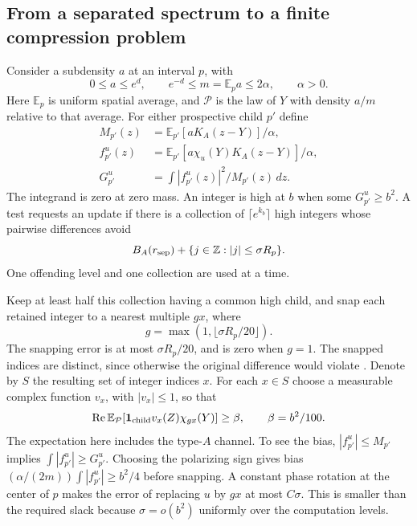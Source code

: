 \subsection{From a separated spectrum to a finite compression problem}

Consider a subdensity $a$ at an interval $p$, with
\[
 0\le a\le e^d,\qquad e^{-d}\le m=\mathbb E_pa\le2\alpha,
 \qquad \alpha>0.
\]
Here $\mathbb E_p$ is uniform spatial average, and $\mathcal P$ is the
law of $Y$ with density $a/m$ relative to that average.  For either
prospective child $p'$ define
\begin{equation}\label{eq:thermal-child-moments}
 \begin{split}
 M_{p'}(z)&=\mathbb E_{p'}[aK_A(z-Y)]/\alpha,\\
 f_{p'}^u(z)&=\mathbb E_{p'}[a\chi_u(Y)K_A(z-Y)]/\alpha,\\
 G_{p'}^u&=\int |f_{p'}^u(z)|^2/M_{p'}(z)\,dz.
 \end{split}
\end{equation}
The integrand is zero at zero mass.  An integer is high at $b$ when
some $G_{p'}^u\ge b^2$.  A test requests an update if there is a
collection of $\lceil e^{k_b}\rceil$ high integers whose pairwise
differences avoid
\begin{equation}\label{eq:thermal-separation}
 B_A(r_{\rm sep})+\{j\in\mathbb Z:|j|\le\sigma R_p\}.
\end{equation}
One offending level and one collection are used at a time.

Keep at least half this collection having a common high child, and snap
each retained integer to a nearest multiple $gx$, where
\[
 g=\max(1,\lfloor\sigma R_p/20\rfloor).
\]
The snapping error is at most $\sigma R_p/20$, and is zero when $g=1$.
The snapped indices are distinct, since otherwise the original
difference would violate .  Denote by $S$ the resulting set of integer indices $x$.  For each $x\in S$ choose a measurable complex function
$v_x$, with $|v_x|\le1$, so that
\begin{equation}\label{eq:source-8}
 \operatorname{Re}\mathbb E_{\mathcal P}
  [\mathbf1_{\rm child}v_x(Z)\chi_{gx}(Y)]\ge\beta,
 \qquad \beta=b^2/100.
\end{equation}
The expectation here includes the type-$A$ channel.  To see the bias,
$|f_{p'}^u|\le M_{p'}$ implies $\int|f_{p'}^u|\ge G_{p'}^u$.
Choosing the polarizing sign gives bias
$(\alpha/(2m))\int|f_{p'}^u|\ge b^2/4$ before snapping.  A constant
phase rotation at the center of $p$ makes the error of replacing $u$
by $gx$ at most $C\sigma$.  This is smaller than the required slack
because $\sigma=o(b^2)$ uniformly over the computation levels.

